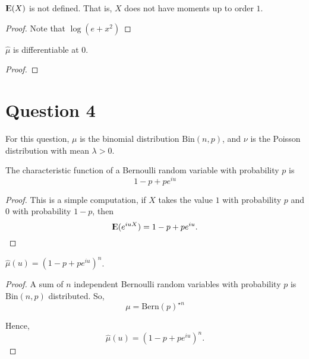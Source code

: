 \documentclass{unswmaths}
\begin{document}
\begin{lemma}
    ${\rm I\kern-.3em E}(X)$ is not defined. That is, $X$ does not have moments up
    to order $1$.
\end{lemma}
\begin{proof}
    Note that $\log(e+x^2) $
\end{proof}
    
\begin{lemma}
    $\hat{\mu}$ is differentiable at $0$.
\end{lemma}
\begin{proof}
    
\end{proof}

\section*{Question 4}
For this question, $\mu$ is the binomial distribution $\mathrm{Bin}(n,p)$,
and $\nu$ is the Poisson distribution with mean $\lambda > 0$.

\begin{lemma}
    The characteristic function of a Bernoulli random variable
    with probability $p$ is
    \begin{equation*}
        1-p+pe^{iu}
    \end{equation*}
\end{lemma}
\begin{proof}
    This is a simple computation, if $X$ takes the value $1$ with probability
    $p$ and $0$ with probability $1-p$, then
    \begin{equation*}
        {\rm I\kern-.3em E}(e^{iuX}) = 1-p+pe^{iu}.
    \end{equation*}
\end{proof}
\begin{lemma}
    $\hat{\mu}(u) = (1-p+pe^{iu})^n$.
\end{lemma}
\begin{proof}
    A sum of $n$ independent Bernoulli random variables with
    probability $p$ is $\mathrm{Bin}(n,p)$ distributed. So,
    \begin{equation*}
        {\mu} = {\mathrm{Bern}(p)}^{\star n}
    \end{equation*}
    
    Hence,
    \begin{equation*}
        \hat{\mu}(u) = (1-p+pe^{iu})^n.
    \end{equation*}
\end{proof}
\end{document}
